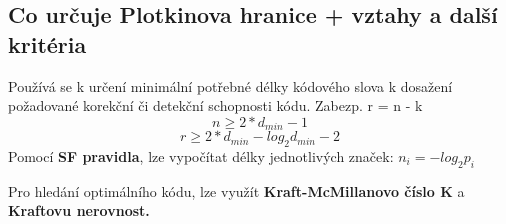 \subsection{Co určuje Plotkinova hranice + vztahy a další kritéria}
Používá se k určení minimální potřebné délky kódového slova k dosažení požadované korekční či detekční schopnosti kódu. Zabezp. r = n - k
$$n \geq 2* d_{min} -1$$
$$r \geq 2* d_{min} -  log_{2}  d_{min} -2$$
Pomocí \textbf{SF pravidla}, lze vypočítat délky jednotlivých značek: $n_{i} = -log_{2}p_{i}$

Pro hledání optimálního kódu, lze využít \textbf{Kraft-McMillanovo číslo K} a \textbf{Kraftovu nerovnost.}
